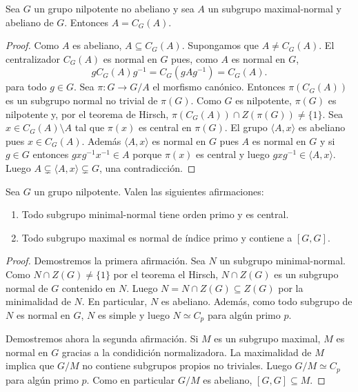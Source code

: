 \begin{corollary}
	Sea $G$ un grupo nilpotente no abeliano y sea $A$ un subgrupo
	maximal-normal y abeliano de $G$. Entonces $A=C_G(A)$.
\end{corollary}

\begin{proof}
	Como $A$ es abeliano, $A\subseteq C_G(A)$. Supongamos que $A\ne C_G(A)$.
	El centralizador $C_G(A)$ es normal en $G$ pues, como $A$ es normal en $G$, 
	\[
		gC_G(A)g^{-1}=C_G(gAg^{-1})=C_G(A).
	\]
	para todo $g\in G$.  Sea $\pi\colon G\to G/A$ el morfismo canónico.
	Entonces $\pi(C_G(A))$ es un subgrupo normal no trivial de $\pi(G)$. Como
	$G$ es nilpotente, $\pi(G)$ es nilpotente y, por el
	teorema de Hirsch, $\pi(C_G(A))\cap Z(\pi(G))\ne\{1\}$. Sea
	$x\in C_G(A)\setminus A$ tal que $\pi(x)$ es central en $\pi(G)$.  El grupo
	$\langle A,x\rangle$ es abeliano pues $x\in C_G(A)$. Además $\langle
	A,x\rangle$ es normal en $G$ pues $A$ es normal en $G$ y  si $g\in G$
	entonces $gxg^{-1}x^{-1}\in A$ porque $\pi(x)$ es central y luego
	$gxg^{-1}\in \langle A,x\rangle$. Luego $A\subsetneq \langle
	A,x\rangle\subsetneq G$, una contradicción.
\end{proof}

\begin{theorem}
	Sea $G$ un grupo nilpotente. Valen las siguientes afirmaciones:
	\begin{enumerate}
		\item Todo subgrupo minimal-normal tiene orden primo y es central.
		\item Todo subgrupo maximal es normal de índice primo y contiene a
			$[G,G]$. 
	\end{enumerate}
\end{theorem}

\begin{proof}
	Demostremos la primera afirmación. Sea $N$ un subgrupo minimal-normal. Como
	$N\cap Z(G)\ne\{1\}$ por el teorema el Hirsch, $N\cap Z(G)$ es
	un subgrupo normal de $G$ contenido en $N$. Luego $N=N\cap Z(G)\subseteq
	Z(G)$ por la minimalidad de $N$. En particular, $N$ es abeliano. Además,
	como todo subgrupo de $N$ es normal en $G$, $N$ es simple y luego $N\simeq
	C_p$ para algún primo $p$.

	Demostremos ahora la segunda afirmación. Si $M$ es un subgrupo maximal, $M$
	es normal en $G$ gracias a la condidición normalizadora. La
	maximalidad de $M$ implica que $G/M$ no contiene subgrupos propios no
	triviales. Luego $G/M\simeq C_p$ para algún primo $p$. Como en particular
	$G/M$ es abeliano, $[G,G]\subseteq M$. 
\end{proof}

